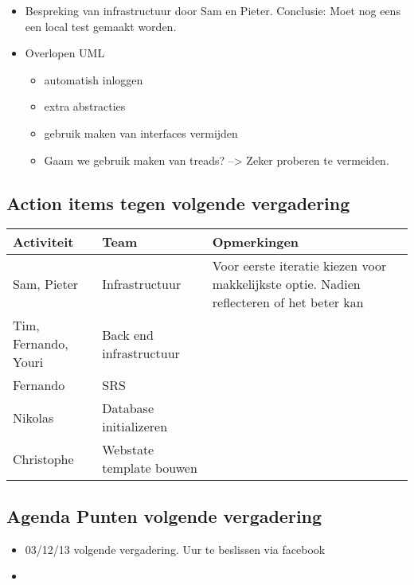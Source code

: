 \begin{itemize}
	\item Bespreking van infrastructuur door Sam en Pieter. Conclusie: Moet nog eens een local test gemaakt worden.
	\item Overlopen UML
		\begin{itemize}
			\item automatish inloggen
			\item extra abstracties
			\item gebruik maken van interfaces vermijden
			\item Gaam we gebruik maken van treads? --> Zeker proberen te vermeiden.
		\end{itemize}
\end{itemize}



\subsection{Action items tegen volgende vergadering}
\begin{table} [H]
	\centering
	\begin{tabular} {l|l|l}
		\textbf{Activiteit} & \textbf{Team} & \textbf{Opmerkingen} \\
		\hline
		Sam, Pieter & Infrastructuur  & Voor eerste iteratie kiezen voor makkelijkste optie. Nadien reflecteren of het beter kan\\
		Tim, Fernando, Youri & Back end infrastructuur & \\
		Fernando & SRS & \\
		Nikolas & Database initializeren & \\ 
		Christophe & Webstate template bouwen & \\
	\end{tabular}
\end{table}

\subsection{Agenda Punten volgende vergadering}

\begin{itemize}
	\item 03/12/13 volgende vergadering. Uur te beslissen via facebook
	\item 
	
\end{itemize}



